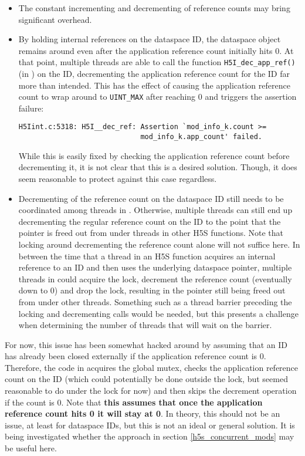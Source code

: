 \documentclass[../HDF5_RFC.tex]{subfiles}
\begin{document}
\begin{itemize}
    \item The constant incrementing and decrementing of reference counts may bring significant overhead.
    \item By holding internal references on the dataspace ID, the dataspace object remains around even
          after the application reference count initially hits 0. At that point, multiple threads are
          able to call the function \texttt{H5I\_dec\_app\_ref()} (in )
          on the ID, decrementing the application reference count for the ID far more than intended. This
          has the effect of causing the application reference count to wrap around to \texttt{UINT\_MAX}
          after reaching 0 and triggers the assertion failure:
          \begin{verbatim}
H5Iint.c:5318: H5I__dec_ref: Assertion `mod_info_k.count >=
                             mod_info_k.app_count' failed.
          \end{verbatim}
          While this is easily fixed by checking the application reference count before decrementing it,
          it is not clear that this is a desired solution. Though, it does seem reasonable to protect
          against this case regardless.
    \item Decrementing of the reference count on the dataspace ID still needs to be coordinated among
          threads in . Otherwise, multiple threads can still end up
          decrementing the regular reference count on the ID to the point that the pointer is freed
          out from under threads in other H5S functions. Note that locking around decrementing the
          reference count alone will not suffice here. In between the time that a thread in an H5S
          function acquires an internal reference to an ID and then uses the underlying dataspace
          pointer, multiple threads in  could acquire the lock,
          decrement the reference count (eventually down to 0) and drop the lock, resulting in the
          pointer still being freed out from under other threads. Something such as a thread barrier
          preceding the locking and decrementing calls would be needed, but this presents a challenge
          when determining the number of threads that will wait on the barrier.
\end{itemize}

For now, this issue has been somewhat hacked around by assuming that an ID has already been closed
externally if the application reference count is 0. Therefore, the code in 
acquires the global mutex, checks the application reference count on the ID (which could potentially be
done outside the lock, but seemed reasonable to do under the lock for now) and then skips the decrement
operation if the count is 0. Note that \textbf{this assumes that once the application reference count hits
0 it will stay at 0}. In theory, this should not be an issue, at least for dataspace IDs, but this is not
an ideal or general solution. It is being investigated whether the approach in section
\ref{h5s_concurrent_mods} may be useful here.
\end{document}
